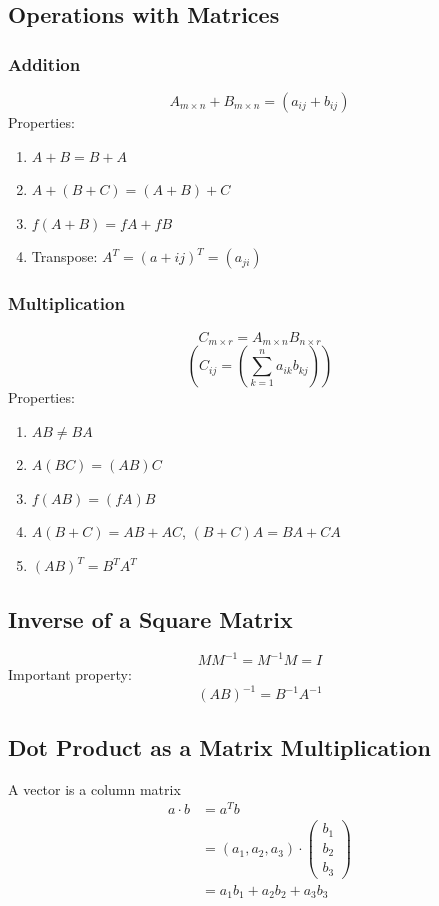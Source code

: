 \documentclass{article}
\begin{document}
\subsection*{Operations with Matrices}
\subsubsection*{Addition}
\[A_{m \times n} + B_{m \times n} = (a_{ij} + b_{ij})\]
Properties:
\begin{enumerate}
    \item $A + B = B + A$
    \item $A + (B + C) = (A + B) + C$
    \item $f(A + B) = fA + fB$
    \item Transpose: $A^T = (a+{ij})^T = (a_{ji})$
\end{enumerate}

\subsubsection*{Multiplication}
\[C_{m \times r} = A_{m \times n} B_{n \times r}\]
\[(C_{ij} =(\sum_{k = 1}^n a_{ik} b_{kj}))\]
Properties:
\begin{enumerate}
    \item $AB \neq BA$
    \item $A(BC) = (AB)C$
    \item $f(AB) = (fA)B$
    \item $A(B + C) = AB + AC$, $(B + C)A = BA + CA$
    \item $(AB)^T = B^T A^T$
\end{enumerate}

\subsection*{Inverse of a Square Matrix}
\[MM^{-1} = M^{-1}M = I\]
Important property:
\[(AB)^{-1} = B^{-1}A^{-1}\]

\subsection*{Dot Product as a Matrix Multiplication}
A vector is a column matrix
\begin{align*}
    a \cdot b &= a^Tb\\
    &= (a_1, a_2, a_3) \cdot \begin{pmatrix}b_1 \\ b_2 \\ b_3 \end{pmatrix}\\
    &= a_1 b_1 + a_2 b_2 + a_3 b_3
\end{align*}
\end{document}
